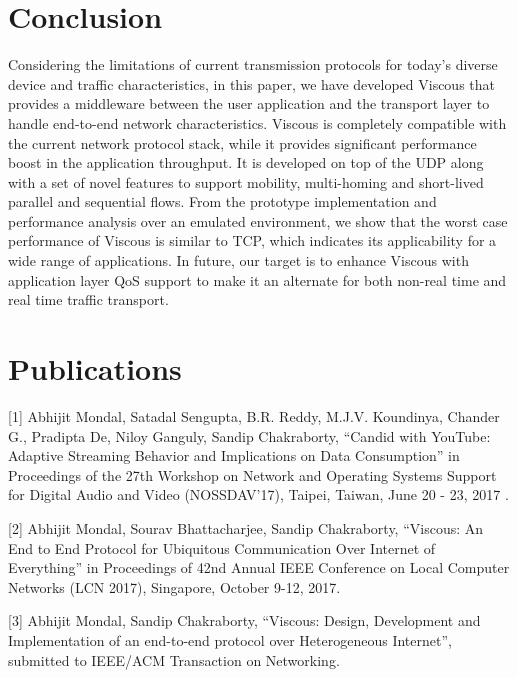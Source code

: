 \section{Conclusion}
Considering the limitations of current transmission protocols for today’s diverse device and traffic characteristics, in this paper, we have developed Viscous that provides a middleware between the user application and the transport layer to handle end-to-end network characteristics. Viscous is completely compatible with the current network protocol stack, while it provides significant performance boost in the application throughput. It is developed on top of the UDP along with a set of novel features to support mobility, multi-homing and short-lived parallel and sequential flows. From the prototype implementation and performance analysis over an emulated environment, we show that the worst case performance of Viscous is similar to TCP, which indicates its applicability for a wide range of applications. 
In future, our target is to enhance Viscous with application layer QoS support to make it an alternate for both non-real time and real time traffic transport.  


\section*{Publications}
[1] Abhijit Mondal, Satadal Sengupta, B.R. Reddy, M.J.V. Koundinya, Chander G., Pradipta De, Niloy Ganguly, Sandip Chakraborty, ``Candid with YouTube: Adaptive Streaming Behavior and Implications on Data Consumption'' in Proceedings of the 27th Workshop on Network and Operating Systems Support for Digital Audio and Video (NOSSDAV'17), Taipei, Taiwan, June 20 - 23, 2017 .

[2] Abhijit Mondal, Sourav Bhattacharjee, Sandip Chakraborty, ``Viscous: An End to End Protocol for Ubiquitous Communication Over Internet of Everything'' in Proceedings of 42nd Annual IEEE Conference on Local Computer Networks (LCN 2017), Singapore, October 9-12, 2017.

[3] Abhijit Mondal, Sandip Chakraborty, ``Viscous: Design, Development and Implementation of an end-to-end protocol over Heterogeneous Internet'', submitted to IEEE/ACM Transaction on Networking.
